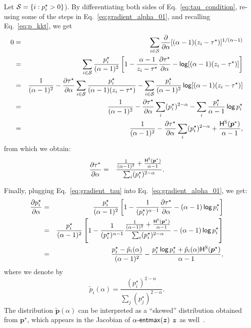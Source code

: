 Let $\mathcal{S} = \{i: p^\star_i > 0 \}$).
By differentiating both sides of Eq.~\ref{eq:tau_condition}, re-using some of
the steps in Eq.~\ref{eq:gradient_alpha_01}, and recalling Eq.~\ref{eq:p_kkt},
we get
\begin{eqnarray}\label{eq:gradient_tau_implicit}
    0 &=& \sum_{i \in \mathcal{S}} \frac{\partial}{\partial \alpha} [(\alpha-1)(z_i - \tau^{\star})]^{1/(\alpha-1)}\nonumber\\
    &=& \sum_{i \in \mathcal{S}} \frac{p_i^{\star}}{(\alpha-1)^2} \left[1 - \frac{\alpha-1}{z_i - \tau^{\star}}\frac{\partial \tau^{\star}}{\partial \alpha} - \operatorname*{\mathsf{log}}[(\alpha-1)(z_i - \tau^{\star})] \right]\nonumber\\
    &=&  \frac{1}{(\alpha-1)^2} - \frac{\partial \tau^{\star}}{\partial \alpha} \sum_{i \in \mathcal{S}} \frac{p_i^{\star}}{(\alpha - 1)(z_i - \tau^{\star})} - \sum_{i \in \mathcal{S}} \frac{p_i^{\star}}{(\alpha-1)^2} \operatorname*{\mathsf{log}}[(\alpha-1)(z_i - \tau^{\star})] \nonumber\\
    &=&  \frac{1}{(\alpha-1)^2} - \frac{\partial \tau^{\star}}{\partial \alpha} \sum_{i} (p_i^{\star})^{2-\alpha} - \sum_{i} \frac{p_i^{\star}}{\alpha-1} \operatorname*{\mathsf{log}} p_i^{\star}\nonumber\\
    &=&  \frac{1}{(\alpha-1)^2} - \frac{\partial \tau^{\star}}{\partial \alpha} \sum_{i} (p_i^{\star})^{2-\alpha} + \frac{\mathsf{H}^\textsc{S}(\bm{p}^*)}{\alpha-1},
\end{eqnarray}
from which we obtain:
\begin{eqnarray}\label{eq:gradient_tau}
    \frac{\partial \tau^{\star}}{\partial \alpha} &=& \frac{\frac{1}{(\alpha-1)^2} + \frac{\mathsf{H}^\textsc{S}(\bm{p}^{\star})}{\alpha-1}}{\sum_i (p_i^{\star})^{2-\alpha}}.
\end{eqnarray}

Finally, plugging Eq.~\ref{eq:gradient_tau} into Eq.~\ref{eq:gradient_alpha_01}, we get:
\begin{eqnarray}\label{eq:gradient_alpha}
    \frac{\partial p_i^{\star}}{\partial \alpha} &=&  \frac{p_i^{\star}}{(\alpha-1)^2} \left[1 - \frac{1}{(p_i^{\star})^{\alpha-1}}\frac{\partial \tau^{\star}}{\partial \alpha} - (\alpha-1)\operatorname*{\mathsf{log}} p_i^{\star} \right]\nonumber\\
    &=&  \frac{p_i^{\star}}{(\alpha-1)^2} \left[1 - \frac{1}{(p_i^{\star})^{\alpha-1}}\frac{\frac{1}{(\alpha-1)^2} + \frac{\mathsf{H}^\textsc{S}(\bm{p}^{\star})}{\alpha-1}}{\sum_i (p_i^{\star})^{2-\alpha}} - (\alpha-1)\operatorname*{\mathsf{log}} p_i^{\star} \right]\nonumber\\
    &=& \frac{p_i^{\star} - \tilde{p}_i(\alpha)}{(\alpha-1)^2} - \frac{p_i^{\star}\operatorname*{\mathsf{log}} p_i^{\star} + \tilde{p}_i(\alpha)\mathsf{H}^\textsc{S}(\bm{p}^{\star})}{\alpha-1},
\end{eqnarray}
where we denote by
\begin{equation}
    \tilde{p}_i(\alpha) = \frac{(p_i^{\star})^{2-\alpha}}{\sum_j (p_j^{\star})^{2-\alpha}}.
\end{equation}
The distribution $\tilde{\bm{p}}(\alpha)$ can be interpreted as a ``skewed''
distribution obtained from $\bm{p}^{\star}$, which appears in the Jacobian of
$\mathop{\mathsf{\alpha}\textnormal{-}\mathsf{entmax}}(\bm{z})$ \wrt $\bm{z}$ as well~\cite{entmax}.


